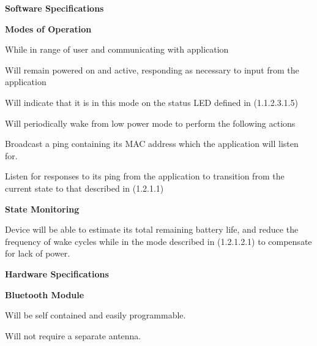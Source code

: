 \documentclass[12pt]{article}
\begin{document}
\begin{packed_enum}
\begin{packed_enum}
\begin{packed_enum}
\begin{packed_enum}
		  				\end{packed_enum}
		  		\end{packed_enum}
		  		\item \textbf{Software Specifications}
		  		\begin{packed_enum}
		  			\item \textbf{Modes of Operation}
		  			\begin{packed_enum}
		  				\item While in range of user and communicating with application
		  				\begin{packed_enum}
		  					\item Will remain powered on and active, responding as necessary to input from the application
		  					\item Will indicate that it is in this mode on the status LED defined in (1.1.2.3.1.5)
		  					\item Will periodically wake from low power mode to perform the following actions
		  					\begin{packed_enum}
		  						\item Broadcast a ping containing its MAC address which the application will listen for.
		  						\item Listen for responses to its ping from the application to transition from the current state to that described in (1.2.1.1)
		  						\end{packed_enum}
		  					\end{packed_enum}
		  				\end{packed_enum}
		  			\item \textbf{State Monitoring}
		  			\begin{packed_enum}
		  				\item Device will be able to estimate its total remaining battery life, and reduce the frequency of wake cycles while in the mode described in (1.2.1.2.1) to compensate for lack of power.
		  				\end{packed_enum}
		  		\end{packed_enum}
		  		\item \textbf{Hardware Specifications}
		  		\begin{packed_enum}
		  			\item \textbf{Bluetooth Module}
		  			\begin{packed_enum}
		  				\item Will be self contained and easily programmable.
		  				\item Will not require a separate antenna.

\end{packed_enum}
\end{packed_enum}
\end{packed_enum}
\end{packed_enum}
\end{document}
